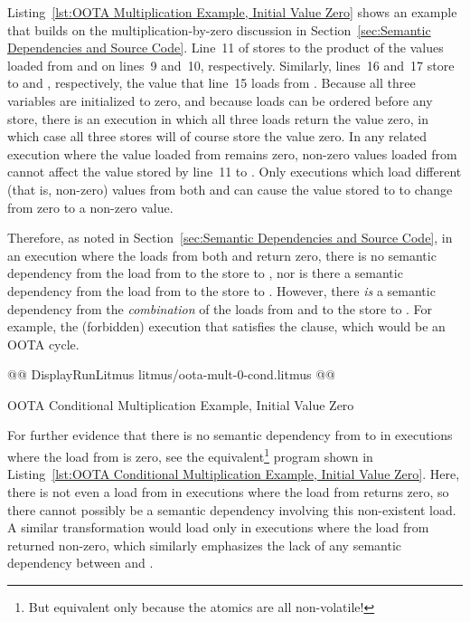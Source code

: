 \documentclass[10]{article}
\begin{document}
Listing~\ref{lst:OOTA Multiplication Example, Initial Value Zero}
shows an example that builds on the multiplication-by-zero
discussion in
Section~\ref{sec:Semantic Dependencies and Source Code}.
Line~11 of  stores to  the product of the values loaded from
 and  on lines~9 and~10, respectively.
Similarly, lines~16 and~17 store to  and , respectively,
the value that line~15 loads from .
Because all three variables are initialized to zero, and because loads
can be ordered before any store, there is an execution in which all
three loads return the value zero, in which case all three stores will
of course store the value zero.
In any related execution where the value loaded from  remains zero,
non-zero values loaded from  cannot affect the value stored by
line~11 to .
Only executions which load different (that is, non-zero) values from
both  and  can cause the value stored to  to change
from zero to a non-zero value.

Therefore, as noted in
Section~\ref{sec:Semantic Dependencies and Source Code},
in an execution where the loads from both  and  return zero,
there is no semantic dependency from the load from  to the
store to , nor is there a semantic dependency from the load
from  to the store to .
However, there \emph{is} a semantic dependency from the \emph{combination}
of the loads from  and  to the store to .
For example, the (forbidden) execution that satisfies the 
clause, which would be an OOTA cycle.

\begin{listing}[tbp]
@@ DisplayRunLitmus litmus/oota-mult-0-cond.litmus @@
\caption{OOTA Conditional Multiplication Example, Initial Value Zero}
\label{lst:OOTA Conditional Multiplication Example, Initial Value Zero}
\end{listing}

For further evidence that there is no semantic dependency from 
to  in executions where the load from  is zero, see the
equivalent\footnote{
	But equivalent only because the atomics are all non-volatile!}
program shown in
Listing~\ref{lst:OOTA Conditional Multiplication Example, Initial Value Zero}.
Here, there is not even a load from  in executions where the
load from  returns zero, so there cannot possibly be a semantic
dependency involving this non-existent load.
A similar transformation would load  only in executions where the
load from  returned non-zero, which similarly emphasizes the lack
of any semantic dependency between  and .
\end{document}
